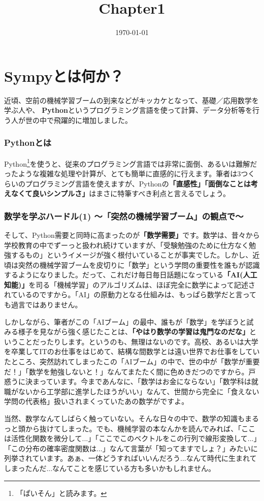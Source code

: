 \documentclass[12pt, a5paper]{jsbook}
\title{Chapter1}
\date{\today}
\begin{document}
\tableofcontents
\chapter{Sympyとは何か？}
近頃、空前の機械学習ブームの到来などがキッカケとなって、基礎／応用数学を学ぶ人や、 {\bf Python}というプログラミング言語を使って計算、データ分析等を行う人が世の中で飛躍的に増加しました。
\subsection{Pythonとは}
Python\footnote{「ぱいそん」と読みます。}を使うと、従来のプログラミング言語では非常に面倒、あるいは難解だったような複雑な処理や計算が、とても簡単に直感的に行えます。筆者は3つくらいのプログラミング言語を使えますが、Pythonの{\bf 「直感性」「面倒なことは考えなくて良いシンプルさ」}はまさに特筆すべき利点と言えるでしょう。
\subsection{数学を学ぶハードル(1) 〜「突然の機械学習ブーム」の観点で〜}
そして、Python需要と同時に高まったのが{\bf 「数学需要」}です。数学は、昔々から学校教育の中でずーっと扱われ続けていますが、「受験勉強のために仕方なく勉強するもの」というイメージが強く根付いていることが事実でした。しかし、近頃は突然の機械学習ブームを皮切りに「数学」という学問の重要性を誰もが認識するようになりました。だって、これだけ毎日毎日話題になっている{\bf 「AI(人工知能)」}を司る「機械学習」のアルゴリズムは、ほぼ完全に数学によって記述されているのですから。「AI」の原動力となる仕組みは、もっぱら数学だと言っても過言ではありません。

しかしながら、筆者がこの「AIブーム」の最中、誰もが「数学」を学ぼうと試みる様子を見ながら強く感じたことは、{\bf 「やはり数学の学習は鬼門なのだな」}ということだったりします。というのも、無理はないのです。高校、あるいは大学を卒業してITのお仕事をはじめて、結構な間数学とは遠い世界でお仕事をしていたところ、突然訪れてしまったこの「AIブーム」の中で、世の中が「数学が重要だ！」「数学を勉強しないと！」なんてまたたく間に色めきだつのですから。戸惑うに決まっています。今まであんなに、「数学はお金にならない」「数学科は就職がないから工学部に進学したほうがいい」なんて、世間から完全に「食えない学問の代表格」扱いされまくっていたあの数学がですよ。

当然、数学なんてしばらく触っていない。そんな日々の中で、数学の知識もまるっと頭から抜けてしまった。でも、機械学習の本なんかを読んでみれば、「ここは活性化関数を微分して...」「ここでこのベクトルをこの行列で線形変換して...」「この分布の確率密度関数は...」なんて言葉が「知ってますでしょ？」みたいに列挙されています。あぁ、一体どうすればいいんだろう...なんて時代に生まれてしまったんだ...なんてことを感じている方も多いかもしれません。
\end{document}
